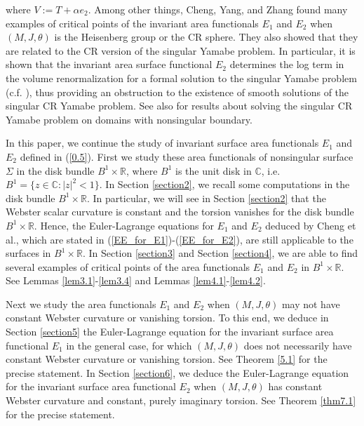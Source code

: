 \documentclass{amsart}
\theoremstyle{Corollary}
\numberwithin{equation}{section}
\begin{document}
where $V:=T+\alpha e_2$. 
Among other things, 
Cheng, Yang, and Zhang 
\cite{CYZ} found
many examples of critical points of 
the invariant area functionals $E_1$ and $E_2$  
when $(M, J,\theta)$ is the Heisenberg group or 
the CR sphere. 
They also showed that they  are related to the CR version of the singular Yamabe problem. 
In particular, it is shown that the invariant area surface functional $E_2$ determines the log term in the volume renormalization
for a formal solution to the singular Yamabe problem (c.f. \cite[Theorem 1]{CYZ}), thus providing an obstruction to the existence of smooth solutions of the singular
CR Yamabe problem. See also \cite{K} for results about 
solving the singular CR Yamabe problem on domains with nonsingular boundary.



In this paper, we continue 
the study of invariant surface area functionals $E_1$ and $E_2$ defined in (\ref{0.5}). 
First we study these area functionals 
of nonsingular surface $\Sigma$ in the disk bundle $B^1\times \mathbb{R}$, 
where $B^1$ is the unit disk in $\mathbb{C}$, i.e. 
$B^1=\{z\in \mathbb{C}: |z|^2<1\}$. 
In Section \ref{section2}, we recall some computations in the disk bundle 
$B^1\times\mathbb{R}$. 
In particular, we will see in Section \ref{section2} that 
the Webster scalar curvature is constant and 
the torsion vanishes for the disk bundle $B^1\times\mathbb{R}$. Hence, the  Euler-Lagrange equations
for $E_1$ and $E_2$ 
deduced by Cheng et al., 
which are stated in (\ref{EE_for_E1})-(\ref{EE_for_E2}), are still applicable to 
the surfaces in $B^1\times\mathbb{R}$. 
In Section \ref{section3} and Section \ref{section4}, we are able to find several examples 
of critical points of the area functionals $E_1$ and $E_2$ in $B^1\times\mathbb{R}$.
See Lemmas \ref{lem3.1}-\ref{lem3.4} and Lemmas \ref{lem4.1}-\ref{lem4.2}. 

Next we study the area functionals $E_1$ and $E_2$
when $(M,J,\theta)$ may not have constant Webster curvature or vanishing torsion. 
To this end, 
we deduce in Section \ref{section5}
the Euler-Lagrange equation for the
invariant surface area functional $E_1$ in the general case, 
for which $(M,J,\theta)$ does not necessarily have
constant Webster curvature or vanishing torsion. 
See Theorem \ref{5.1} for the precise statement. 
In Section \ref{section6}, 
we deduce 
the Euler-Lagrange equation for the
invariant surface area functional $E_2$ 
when $(M,J,\theta)$ has constant Webster curvature 
and  constant, purely imaginary torsion. 
See Theorem \ref{thm7.1} for the precise statement. 
\end{document}
